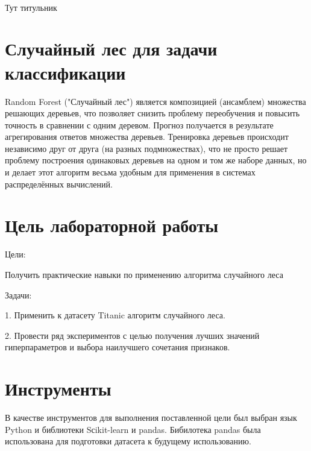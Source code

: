 \documentclass[a4paper,12pt]{article}
\begin{document}
\begin{titlepage}
\newpage

\

Тут титульник
\end{titlepage}

\newpage
\tableofcontents
\setcounter{page}{2}


\newpage\section{Случайный лес для задачи классификации} 
	Random Forest ("Случайный лес") является композицией (ансамблем) множества решающих деревьев, что позволяет снизить проблему переобучения и повысить точность в сравнении с одним деревом. Прогноз получается в результате агрегирования ответов множества деревьев. Тренировка деревьев происходит независимо друг от друга (на разных подмножествах), что не просто решает проблему построения одинаковых деревьев на одном и том же наборе данных, но и делает этот алгоритм весьма удобным для применения в системах распределённых вычислений.
	
	\vspace{0.5cm}
	
	
	
\newpage\section{Цель лабораторной работы} 
	Цели: 
	\vspace{0.5cm}
	
	Получить практические навыки по применению алгоритма случайного леса
	
	\vspace{0.5cm}
	Задачи: 
	
	\vspace{0.5cm}
	1. Применить к датасету Titanic алгоритм случайного леса.
	
	\vspace{0.5cm}
	2. Провести ряд экспериментов с целью получения лучших значений гиперпараметров и выбора наилучшего сочетания признаков.
	
	
\newpage\section{Инструменты} 
	В качестве инструментов для выполнения поставленной цели был выбран язык Python и библиотеки Sсikit-learn и pandas.
	Бибилотека pandas была использована для подготовки датасета к будущему использованию.
	
\end{document}
